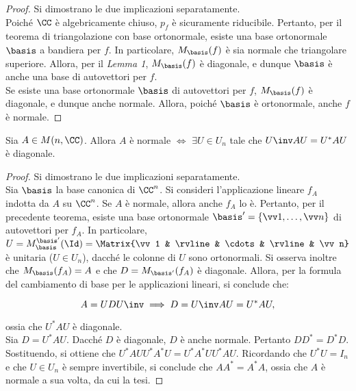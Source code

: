 \documentclass[11pt]{article}
\begin{document}
	\begin{proof} Si dimostrano le due implicazioni separatamente. \\
		
		\rightproof Poiché $\CC$ è algebricamente chiuso, $p_f$ è sicuramente riducibile. Pertanto,
		per il teorema di triangolazione con base ortonormale, esiste una base ortonormale $\basis$
		a bandiera per $f$. In particolare, $M_\basis(f)$ è sia normale che triangolare superiore.
		Allora, per il \textit{Lemma 1}, $M_\basis(f)$ è diagonale, e dunque $\basis$ è anche una
		base di autovettori per $f$. \\
		
		\leftproof Se esiste una base ortonormale $\basis$ di autovettori per $f$, $M_\basis(f)$ è
		diagonale, e dunque anche normale. Allora, poiché $\basis$ è ortonormale, anche $f$
		è normale.
	\end{proof}
	
	\begin{corollary}
		Sia $A \in M(n, \CC)$. Allora $A$ è normale $\iff$ $\exists U \in U_n$ tale che $U\inv A U = U^* A U$
		è diagonale.
	\end{corollary}
	
	\begin{proof} Si dimostrano le due implicazioni separatamente. \\
		
		\rightproof Sia $\basis$ la base canonica di $\CC^n$.
		Si consideri l'applicazione lineare $f_A$ indotta da $A$ su $\CC^n$. Se $A$ è normale, allora
		anche $f_A$ lo è. Pertanto, per il precedente teorema, esiste una base ortonormale $\basis' = \{ \vv 1, \ldots, \vv n \}$ di
		autovettori per $f_A$. In particolare, $U = M_{\basis}^{\basis'}(\Id) = \Matrix{\vv 1 & \rvline & \cdots & \rvline & \vv n}$ è unitaria ($U \in U_n$), dacché le colonne di $U$ sono ortonormali. Si osserva inoltre che
		$M_{\basis}(f_A) = A$ e che $D = M_{\basis'}(f_A)$ è diagonale. Allora, per la formula del cambiamento di base per le applicazioni lineari,
		si conclude che:
		
		\[ A = U D U\inv \implies D = U\inv A U = U^* A U, \]
		
		ossia che $U^* A U$ è diagonale. \\
		
		\leftproof Sia $D = U^* A U$. Dacché $D$ è diagonale, $D$ è anche normale. Pertanto $D D^* = D^* D$.
		Sostituendo, si ottiene che $U^* A U U^* A^* U = U^* A^* U U^* A U$. Ricordando che $U^* U = I_n$ e
		che $U \in U_n$ è sempre invertibile, si conclude che $A A^* = A^* A$, ossia che $A$ è normale a
		sua volta, da cui la tesi. 
	\end{proof}
\end{document}
